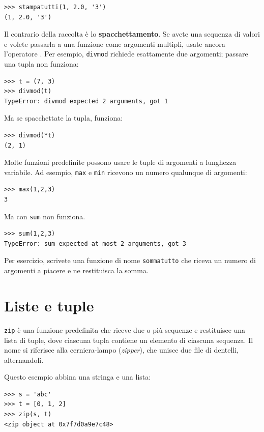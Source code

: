 \documentclass[10pt]{book}
\begin{document}
\begin{verbatim}
>>> stampatutti(1, 2.0, '3')
(1, 2.0, '3')
\end{verbatim}
%
Il contrario della raccolta è lo {\bf spacchettamento}.  Se avete una sequenza di valori e volete passarla a una funzione come argomenti multipli, usate ancora
 l'operatore {\tt *}. Per esempio, {\tt divmod} richiede esattamente due argomenti; passare una tupla non funziona:

\begin{verbatim}
>>> t = (7, 3)
>>> divmod(t)
TypeError: divmod expected 2 arguments, got 1
\end{verbatim}
%
Ma se spacchettate la tupla, funziona:

\begin{verbatim}
>>> divmod(*t)
(2, 1)
\end{verbatim}
%


Molte funzioni predefinite possono usare le tuple di argomenti a lunghezza variabile. Ad esempio, {\tt max} e {\tt min} ricevono un numero qualunque di argomenti:

\begin{verbatim}
>>> max(1,2,3)
3
\end{verbatim}
%
Ma con {\tt sum} non funziona.

\begin{verbatim}
>>> sum(1,2,3)
TypeError: sum expected at most 2 arguments, got 3
\end{verbatim}
%
Per esercizio, scrivete una funzione di nome {\tt sommatutto} che riceva un numero di argomenti a piacere e ne restituisca la somma.


\section{Liste e tuple}

{\tt zip} è una funzione predefinita che riceve due o più sequenze e restituisce una lista di tuple, dove ciascuna tupla contiene un elemento di ciascuna sequenza.  Il nome si riferisce alla cerniera-lampo ({\em zipper}), che unisce due file di dentelli, alternandoli.

Questo esempio abbina una stringa e una lista:

\begin{verbatim}
>>> s = 'abc'
>>> t = [0, 1, 2]
>>> zip(s, t)
<zip object at 0x7f7d0a9e7c48>
\end{verbatim}
%
\end{document}
